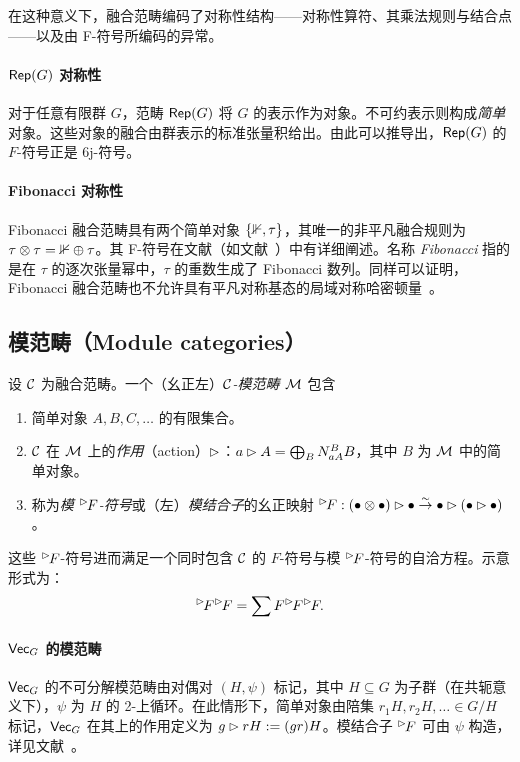 \bigskip\noindent 在这种意义下，融合范畴编码了对称性结构——对称性算符、其乘法规则与结合点——以及由 F-符号所编码的异常。

\paragraph{$\mathsf{Rep}(G)$ 对称性} 对于任意有限群 $G$，范畴 $\mathsf{Rep}(G)$ 将 $G$ 的表示作为对象。不可约表示则构成\emph{简单}对象。这些对象的融合由群表示的标准张量积给出。由此可以推导出，$\mathsf{Rep}(G)$ 的 $F$-符号正是 6j-符号。

\paragraph{Fibonacci 对称性}
Fibonacci 融合范畴具有两个简单对象 $\{\mathbb 1,\tau\}$，其唯一的非平凡融合规则为 $\tau\otimes\tau=\mathbb 1\oplus\tau$。其 F-符号在文献（如文献~\cite{Beer2018}）中有详细阐述。名称 \emph{Fibonacci} 指的是在 $\tau$ 的逐次张量幂中，$\tau$ 的重数生成了 Fibonacci 数列。同样可以证明，Fibonacci 融合范畴也不允许具有平凡对称基态的局域对称哈密顿量~\cite{GarreRubio2022}。

\subsection{模范畴（Module categories）}
设 $\mathcal C$ 为融合范畴。一个（幺正左）\emph{$\mathcal C$-模范畴 $\mathcal M$} 包含
\begin{enumerate}
    \item 简单对象 $A,B,C,\dots$ 的有限集合。
    \item $\mathcal C$ 在 $\mathcal M$ 上的\emph{作用}（action）$\rhd$：$a\rhd A =\bigoplus_{B} N_{aA}^{B}B$，其中 $B$ 为 $\mathcal M$ 中的简单对象。
    \item 称为\emph{模 ${}^{\rhd\!} F$-符号}或（左）\emph{模结合子}的幺正映射 ${}^{\rhd\!} F:(\bullet \otimes\bullet)\rhd\bullet\overset{\sim}{\rightarrow}\bullet\rhd(\bullet\rhd\bullet)$。
\end{enumerate}
这些 ${}^{\rhd\!} F$-符号进而满足一个同时包含 $\mathcal C$ 的 $F$-符号与模 ${}^{\rhd\!} F$-符号的自洽方程。示意形式为：
\begin{equation}
    {}^{\rhd\!} F{}^{\rhd\!} F = \sum F{}^{\rhd\!} F{}^{\rhd\!} F.
\end{equation}

\paragraph{$\mathsf{Vec}_G$ 的模范畴}
$\mathsf{Vec}_G$ 的不可分解模范畴由对偶对 $(H,\psi)$ 标记，其中 $H\subseteq G$ 为子群（在共轭意义下），$\psi$ 为 $H$ 的 2-上循环。在此情形下，简单对象由陪集 $r_1H,r_2H,\dots\in G/H$ 标记，$\mathsf{Vec}_G$ 在其上的作用定义为 $g\rhd rH := (gr)H$。模结合子 ${}^{\rhd\!} F$ 可由 $\psi$ 构造，详见文献~\cite{Naidu2006}。


